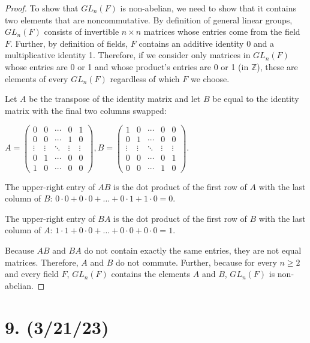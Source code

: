 \documentclass{article}
\begin{document}
\begin{proof}
    To show that $GL_n(F)$ is non-abelian, we need to show that it contains two elements that are noncommutative. By definition of general linear groups, $GL_n(F)$ consists of invertible $n \times n$ matrices whose entries come from the field $F$. Further, by definition of fields, $F$ contains an additive identity 0 and a multiplicative identity 1. Therefore, if we consider only matrices in $GL_n(F)$ whose entries are 0 or 1 and whose product's entries are 0 or 1 (in $\mathbb{Z}$), these are elements of every $GL_n(F)$ regardless of which $F$ we choose.

    Let $A$ be the transpose of the identity matrix and let $B$ be equal to the identity matrix with the final two columns swapped:
    
    $A = \begin{pmatrix}
        0 & 0 & \cdots & 0 & 1\\
        0 & 0 & \cdots & 1 & 0\\
        \vdots & \vdots & \ddots & \vdots & \vdots \\
        0 & 1 & \cdots & 0 & 0\\
        1 & 0 & \cdots & 0 & 0
    \end{pmatrix}, 
    B = \begin{pmatrix}
        1 & 0 & \cdots & 0 & 0\\
        0 & 1 & \cdots & 0 & 0\\
        \vdots & \vdots & \ddots & \vdots & \vdots \\
        0 & 0 & \cdots & 0 & 1\\
        0 & 0 & \cdots & 1 & 0
    \end{pmatrix}$.

    The upper-right entry of $AB$ is the dot product of the first row of $A$ with the last column of $B$: $0 \cdot 0 + 0 \cdot 0 + \ldots + 0 \cdot 1 + 1 \cdot 0 = 0$.

    The upper-right entry of $BA$ is the dot product of the first row of $B$ with the last column of $A$: $1 \cdot 1 + 0 \cdot 0 + \ldots + 0 \cdot 0 + 0 \cdot 0 = 1$.

    Because $AB$ and $BA$ do not contain exactly the same entries, they are not equal matrices. Therefore, $A$ and $B$ do not commute. Further, because for every $n \geq 2$ and every field $F$, $GL_n(F)$ contains the elements $A$ and $B$, $GL_n(F)$ is non-abelian.
\end{proof}

\section*{9. (3/21/23)}
\end{document}
